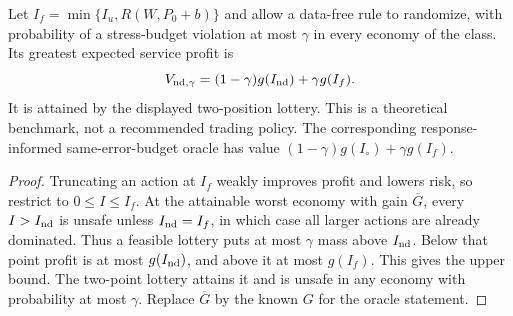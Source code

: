 \begin{lemma}\label{fhc:nodata-chance}
Let $I_f=\min\{I_u,R(W,P_0+b)\}$ and allow a data-free rule to randomize,
with probability of a stress-budget violation at most $\gamma$ in every
economy of the class. Its greatest expected service profit is
\[
 V_{{\rm nd},\gamma}=(1-\gamma)g(I_{\rm nd})+\gamma g(I_f).
\]
It is attained by the displayed two-position lottery. This is a theoretical
benchmark, not a recommended trading policy. The corresponding response-
informed same-error-budget oracle has value
$(1-\gamma)g(I_\circ)+\gamma g(I_f)$.
\end{lemma}

\begin{proof}
Truncating an action at $I_f$ weakly improves profit and lowers risk, so
restrict to $0\le I\le I_f$. At the attainable worst economy with gain
$\overline G$, every $I>I_{\rm nd}$ is unsafe unless $I_{\rm nd}=I_f$,
in which case all larger actions are already dominated. Thus a feasible
lottery puts at most $\gamma$ mass above $I_{\rm nd}$. Below that point
profit is at most $g(I_{\rm nd})$, and above it at most $g(I_f)$.
This gives the upper bound. The two-point lottery attains it and is unsafe
in any economy with probability at most $\gamma$. Replace $\overline G$
by the known $G$ for the oracle statement.
\end{proof}

